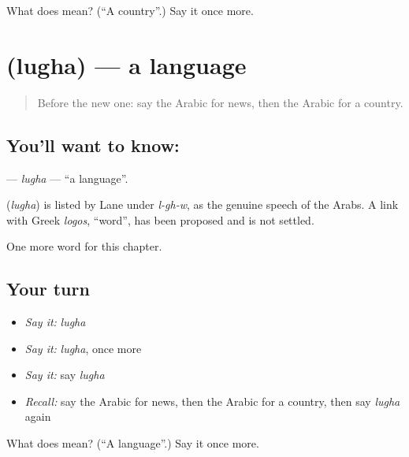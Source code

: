 \begin{tcolorbox}[breakable,colback=teal!4,colframe=teal!35!black,title={Before you move on}]
What does  mean? (\textquotedblleft{}A country\textquotedblright{}.) Say it once more.
\end{tcolorbox}
\section[\texorpdfstring{\ar{لغة} (lugha)}{لغة (lugha)}]{ (lugha) — a language}

\label{lesson:AR-C99-lugha}



\begin{quote}
Before the new one: say the Arabic for news, then the Arabic for a country.
\end{quote}

\subsection*{You'll want to know: }
\textbf{} — \emph{lugha} — \textquotedblleft{}a language\textquotedblright{}.

\begin{cousinweb}
\textbf{} (\emph{lugha}) is listed by Lane under \emph{l-gh-w}, as the genuine speech of the Arabs. A link with Greek \emph{logos}, \textquotedblleft{}word\textquotedblright{}, has been proposed and is not settled.
\end{cousinweb}

\begin{grammarlens}[title={What you've built}]
One more word for this chapter.
\end{grammarlens}

\subsection*{Your turn}
\begin{itemize}
\raggedright
  \item \emph{Say it:} \emph{lugha}
  \item \emph{Say it:} \emph{lugha}, once more
  \item \emph{Say it:} say \emph{lugha}
  \item \emph{Recall:} say the Arabic for news, then the Arabic for a country, then say \emph{lugha} again
\end{itemize}

\begin{tcolorbox}[breakable,colback=teal!4,colframe=teal!35!black,title={Before you move on}]
What does  mean? (\textquotedblleft{}A language\textquotedblright{}.) Say it once more.
\end{tcolorbox}
